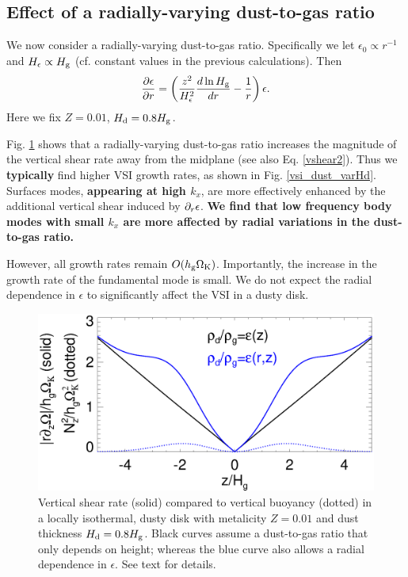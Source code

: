 \subsection{Effect of a radially-varying dust-to-gas ratio}\label{varHd}

We now consider a radially-varying dust-to-gas ratio. Specifically we
let $\epsilon_0\propto r^{-1}$ and $H_\epsilon \propto H_\mathrm{g}$
(cf. constant values in the previous calculations). Then
\begin{align*} 
  \frac{\partial\epsilon}{\partial r} =
  \left(\frac{z^2}{H_\epsilon^2}\frac{d\ln{H_\mathrm{g}}}{dr} -
    \frac{1}{r}\right)\epsilon.   
\end{align*}
Here we fix $Z=0.01$, $H_\mathrm{d}=0.8H_\mathrm{g}$.       

Fig. \ref{compare_vshear_varHd} shows that a radially-varying
dust-to-gas ratio increases the magnitude of the vertical shear rate
away from the midplane (see also Eq. \ref{vshear2}). Thus we {\bf
  typically} find higher VSI growth rates, as shown in
Fig. \ref{vsi_dust_varHd}. 
Surfaces modes, {\bf appearing at high $k_x$}, are more effectively
enhanced by the additional vertical shear induced by
$\partial_r\epsilon$. {\bf We find that low frequency body modes with small
  $k_x$ are more affected by radial variations in the 
  dust-to-gas ratio.}    

However, all growth rates remain
$O(h_\mathrm{g}\Omega_{\rm K})$. Importantly, the increase in the growth rate of the
fundamental mode is small. We do not expect the radial
dependence in $\epsilon$ to significantly affect the VSI in a dusty
disk. 

\begin{figure}
  \includegraphics[width=\linewidth]{figures/compare_vshear_Nz2_varHd} 
  \caption{Vertical shear rate (solid) compared to vertical buoyancy
    (dotted) in a locally isothermal, dusty disk 
    with metalicity $Z=0.01$ and dust thickness $H_\mathrm{d}=0.8H_\mathrm{g}$.
    Black curves assume a dust-to-gas ratio that only depends on
    height; whereas the blue curve also allows a radial dependence in
    $\epsilon$. See text for details.  
    \label{compare_vshear_varHd}
    }
\end{figure}



